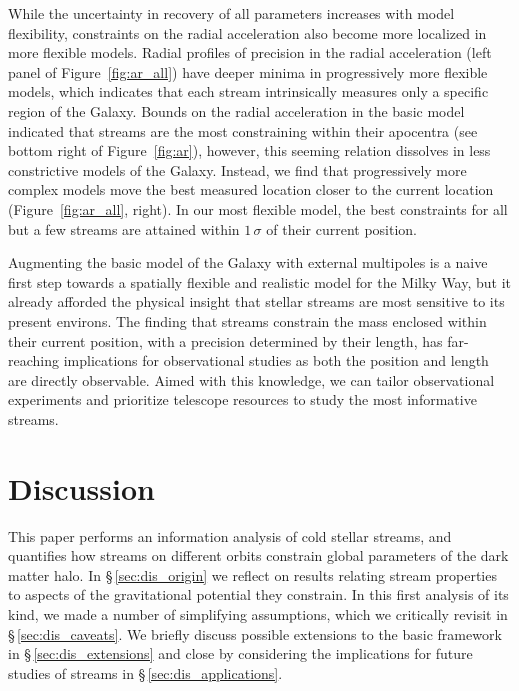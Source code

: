 \documentclass[modern]{aastex62}
\begin{document}
While the uncertainty in recovery of all parameters increases with model flexibility, constraints on the radial acceleration also become more localized in more flexible models.
Radial profiles of precision in the radial acceleration (left panel of Figure~\ref{fig:ar_all}) have deeper minima in progressively more flexible models, which indicates that each stream intrinsically measures only a specific region of the Galaxy.
Bounds on the radial acceleration in the basic model indicated that streams are the most constraining within their apocentra (see bottom right of Figure~\ref{fig:ar}), however, this seeming relation dissolves in less constrictive models of the Galaxy.
Instead, we find that progressively more complex models move the best measured location closer to the current location (Figure~\ref{fig:ar_all}, right).
In our most flexible model, the best constraints for all but a few streams are attained within $1\,\sigma$ of their current position.

Augmenting the basic model of the Galaxy with external multipoles is a naive first step towards a spatially flexible and realistic model for the Milky Way, but it already afforded the physical insight that stellar streams are most sensitive to its present environs.
The finding that streams constrain the mass enclosed within their current position, with a precision determined by their length, has far-reaching implications for observational studies as both the position and length are directly observable.
Aimed with this knowledge, we can tailor observational experiments and prioritize telescope resources to study the most informative streams.

\section{Discussion}
\label{sec:discussion}
This paper performs an information analysis of cold stellar streams, and quantifies how streams on different orbits constrain global parameters of the dark matter halo.
In \S\,\ref{sec:dis_origin} we reflect on results relating stream properties to aspects of the gravitational potential they constrain.
In this first analysis of its kind, we made a number of simplifying assumptions, which we critically revisit in \S\,\ref{sec:dis_caveats}.
We briefly discuss possible extensions to the basic framework in \S\,\ref{sec:dis_extensions} and close by considering the implications for future studies of streams in \S\,\ref{sec:dis_applications}.
\end{document}
